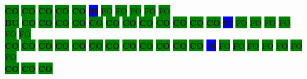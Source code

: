 \colorbox{green}{\color[rgb]{0,0,0}\textbf{CO}}%
\colorbox{green}{\color[rgb]{0,0,0}\textbf{CO}}%
\colorbox{green}{\color[rgb]{0,0,0}\textbf{CO}}%
\colorbox{green}{\color[rgb]{0,0,0}\textbf{CO}}%
\colorbox{green}{\color[rgb]{0,0,0}\textbf{CO}}%
\colorbox{blue}{\color[rgb]{1,0,0}\textbf{09}}%
\colorbox{green}{\color[gray]{0.75}FO}%
\colorbox{green}{\color[gray]{0.75}FO}%
\colorbox{green}{\color[gray]{0.75}FO}%
\colorbox{green}{\color[gray]{0.75}FO}%
\colorbox{green}{\color[gray]{0.75}FO}%
\\
\colorbox{green}{\color[rgb]{1,0,0}\textbf{BU}}%
\colorbox{green}{\color[rgb]{0,0,0}\textbf{CO}}%
\colorbox{green}{\color[rgb]{0,0,0}\textbf{CO}}%
\colorbox{green}{\color[rgb]{0,0,0}\textbf{CO}}%
\colorbox{green}{\color[rgb]{0,0,0}\textbf{CO}}%
\colorbox{green}{\color[rgb]{0,0,0}\textbf{CO}}%
\colorbox{green}{\color[rgb]{0,0,0}\textbf{CO}}%
\colorbox{green}{\color[rgb]{0,0,0}\textbf{CO}}%
\colorbox{green}{\color[rgb]{0,0,0}\textbf{CO}}%
\colorbox{green}{\color[rgb]{0,0,0}\textbf{CO}}%
\colorbox{green}{\color[rgb]{0,0,0}\textbf{CO}}%
\colorbox{green}{\color[rgb]{0,0,0}\textbf{CO}}%
\colorbox{green}{\color[rgb]{0,0,0}\textbf{CO}}%
\colorbox{blue}{\color[rgb]{1,0,0}\textbf{07}}%
\colorbox{green}{\color[gray]{0.75}FO}%
\colorbox{green}{\color[gray]{0.75}FO}%
\colorbox{green}{\color[gray]{0.75}FO}%
\colorbox{green}{\color[gray]{0.75}FO}%
\colorbox{green}{\color[gray]{0.75}FO}%
\colorbox{green}{\color[gray]{0.75}FO}%
\\
\colorbox{green}{\color[rgb]{0,0,0}\textbf{CO}}%
\colorbox{green}{\color[rgb]{0,0,0}\textbf{CO}}%
\colorbox{green}{\color[rgb]{0,0,0}\textbf{CO}}%
\colorbox{green}{\color[rgb]{0,0,0}\textbf{CO}}%
\colorbox{green}{\color[rgb]{0,0,0}\textbf{CO}}%
\colorbox{green}{\color[rgb]{0,0,0}\textbf{CO}}%
\colorbox{green}{\color[rgb]{0,0,0}\textbf{CO}}%
\colorbox{green}{\color[rgb]{0,0,0}\textbf{CO}}%
\colorbox{green}{\color[rgb]{0,0,0}\textbf{CO}}%
\colorbox{green}{\color[rgb]{0,0,0}\textbf{CO}}%
\colorbox{green}{\color[rgb]{0,0,0}\textbf{CO}}%
\colorbox{green}{\color[rgb]{0,0,0}\textbf{CO}}%
\colorbox{blue}{\color[rgb]{1,0,0}\textbf{05}}%
\colorbox{green}{\color[gray]{0.75}FO}%
\colorbox{green}{\color[gray]{0.75}FO}%
\colorbox{green}{\color[gray]{0.75}FO}%
\colorbox{green}{\color[gray]{0.75}FO}%
\colorbox{green}{\color[gray]{0.75}FO}%
\colorbox{green}{\color[gray]{0.75}FO}%
\colorbox{green}{\color[gray]{0.75}FO}%
\\
\colorbox{green}{\color[rgb]{0,0,0}\textbf{CO}}%
\colorbox{green}{\color[rgb]{0,0,0}\textbf{CO}}%
\colorbox{green}{\color[rgb]{0,0,0}\textbf{CO}}%
